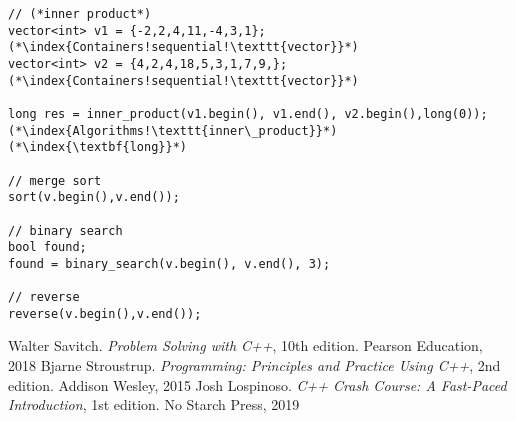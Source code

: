 \documentclass[10pt]{article}
\begin{document}
\begin{lstlisting}
// (*inner product*)
vector<int> v1 = {-2,2,4,11,-4,3,1};(*\index{Containers!sequential!\texttt{vector}}*)
vector<int> v2 = {4,2,4,18,5,3,1,7,9,};(*\index{Containers!sequential!\texttt{vector}}*)

long res = inner_product(v1.begin(), v1.end(), v2.begin(),long(0));(*\index{Algorithms!\texttt{inner\_product}}*)(*\index{\textbf{long}}*)

// merge sort
sort(v.begin(),v.end());

// binary search
bool found;
found = binary_search(v.begin(), v.end(), 3);

// reverse
reverse(v.begin(),v.end());
\end{lstlisting}
%
%
\small
\begin{thebibliography}{99}
 Walter Savitch. \textsl{Problem Solving with C++}, 10th edition. Pearson Education, 2018
 Bjarne Stroustrup. \textsl{Programming: Principles and Practice Using C++}, 2nd edition. Addison Wesley, 2015
 Josh Lospinoso. \textsl{C++ Crash Course: A Fast-Paced Introduction}, 1st edition. No Starch Press, 2019
\end{thebibliography}
%
%
\printindex
\end{document}
